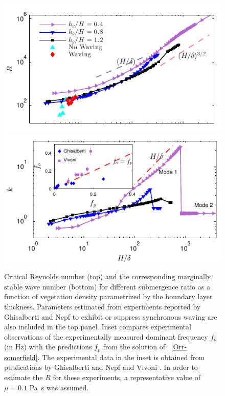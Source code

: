 \documentclass[aps,prl,twocolumn,superscriptaddress,sort&compress,10pt]{revtex4-1}  %
\newcommand{\Rey}{{R}}
\begin{document}
\begin{figure}
\begin{center}
\includegraphics[]{Critical_Re_vs_delta_noshear} \\
\vspace{-6mm} \hspace{-3mm}
\includegraphics[]{K_vs_shear_width_noshear}
\end{center}
\caption{Critical Reynolds number (top) and the corresponding marginally stable wave number (bottom) for different submergence ratio as a function of vegetation density parametrized by the boundary layer thickness. 
Parameters estimated from experiments reported by Ghisalberti and Nepf \cite{Ghisal02} to exhibit or suppress synchronous waving are also included in the top panel. 
Inset compares experimental observations of the experimentally measured dominant frequency $f_o$ (in Hz) with the predictions $f_p$ from the solution of ~\eqref{Orr-somerfield}. 
The experimental data in the inset is obtained from publications by Ghisalberti and Nepf \cite{Ghisal02} and Vivoni \cite{Vivoni98}. 
In order to estimate the $\Rey$ for these experiments, a representative value of $\mu=0.1$ Pa~s was assumed.}
\label{Re_vs_delta}
\end{figure}
\end{document}
